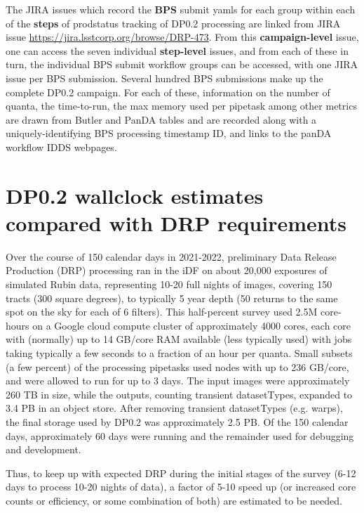 \documentclass[OPS,authoryear,toc]{lsstdoc}
\begin{document}
The JIRA issues which record the {\bf BPS} submit yamls for each group
within each of the {\bf steps} of {\rm prodstatus} tracking of DP0.2
processing are linked from JIRA issue
\url{https://jira.lsstcorp.org/browse/DRP-473}.  From this 
{\bf campaign-level} issue, one can access the seven individual {\bf step-level}
issues, and from each of these in turn, the individual BPS submit
workflow groups can be accessed, with one JIRA issue per BPS submission. 
Several hundred BPS submissions make up the complete DP0.2 campaign.
For each of these, information on the number of quanta, 
the time-to-run, the max memory used per pipetask among 
other metrics are drawn from Butler and PanDA tables and are 
recorded along with a uniquely-identifying BPS processing timestamp ID, 
and links to the panDA workflow IDDS webpages.

\section{DP0.2 wallclock estimates compared with DRP requirements}

Over the course of 150 calendar days in 2021-2022, preliminary Data
Release Production (DRP) processing ran in the iDF on about 20,000
exposures of simulated Rubin data, representing 10-20 full nights of
images, covering 150 tracts (300 square degrees), to typically 5 year
depth (50 returns to the same spot on the sky for each of 6 filters).
This half-percent survey used 2.5M core-hours on a Google cloud compute 
cluster of approximately 4000 cores, each core with (normally) up 
to 14 GB/core RAM available (less typically used) with jobs 
taking typically a few seconds to a fraction of an hour per quanta.  
Small subsets (a few percent) of the processing pipetasks used nodes 
with up to 236 GB/core, and were allowed to run for up to 3 days.  
The input images were approximately 260 TB in size, while the outputs, 
counting transient datasetTypes, expanded to 3.4 PB in an object store.  
After removing transient datasetTypes (e.g. warps), the final storage 
used by DP0.2 was approximately 2.5 PB.  Of the 150 calendar days, 
approximately 60 days were running and the remainder used for 
debugging and development.

Thus, to keep up with expected DRP during the initial stages of the survey
(6-12 days to process 10-20 nights of data), a factor of 5-10 speed up
(or increased core counts or efficiency, or some combination of both) 
are estimated to be needed.   


\appendix
\end{document}

